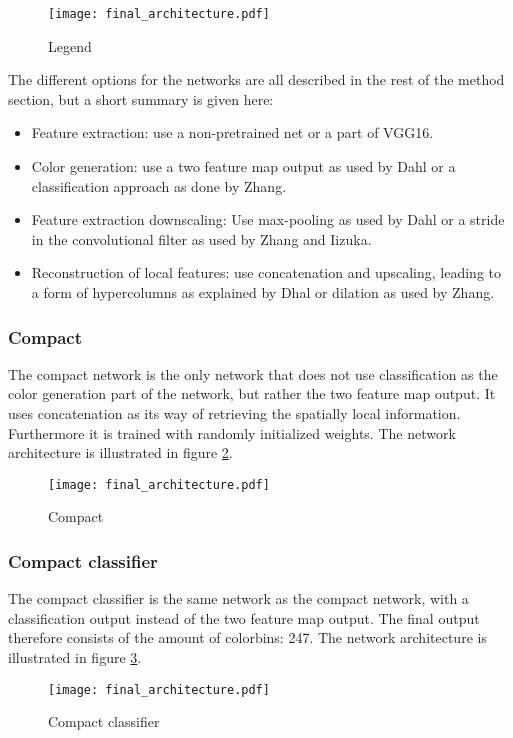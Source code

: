 \begin{figure}[h!]
	\centering
	\texttt{[image: final\_architecture.pdf]}
	\caption{Legend}
	\label{fig:Legend}
\end{figure}

The different options for the networks are all described in the rest of the method section, but a short summary is given here:
\begin{itemize}
	\item Feature extraction: use a non-pretrained net or a part of VGG16.
	\item Color generation: use a two feature map output as used by Dahl \cite{Dahl} or a classification approach as done by Zhang\cite{Zhang}.
	\item Feature extraction downscaling: Use max-pooling as used by Dahl \cite{Dahl} or a stride in the convolutional filter as used by Zhang and Iizuka\cite{Zhang}\cite{IizukaSIGGRAPH2016}.
	\item Reconstruction of local features: use concatenation and upscaling, leading to a form of hypercolumns as explained by Dhal\cite{Dahl} or dilation as used by Zhang\cite{Zhang}.
\end{itemize}










\subsubsection{Compact}
The compact network is the only network that does not use classification as the color generation part of the network, but rather the two feature map output. It uses concatenation as its way of retrieving the spatially local information. Furthermore it is trained with randomly initialized weights. The network architecture is illustrated in figure \ref{fig:compact}.
\begin{figure}[H]
	\centering
	\texttt{[image: final\_architecture.pdf]}
	\caption{Compact}
	\label{fig:compact}
\end{figure}

\subsubsection{Compact classifier}
The compact classifier is the same network as the compact network, with a classification output instead of the two feature map output. The final output therefore consists of the amount of colorbins: 247. The network architecture is illustrated in figure \ref{fig:compact_classifier}. 
\begin{figure}[H]
	\centering
	\texttt{[image: final\_architecture.pdf]}
	\caption{Compact classifier}
	\label{fig:compact_classifier}
\end{figure}

